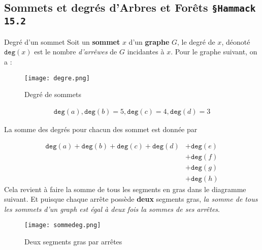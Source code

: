 \documentclass[16pt]{report}
\begin{document}
\begin{multicols*}{2}
             \section{Sommets et degrés d'Arbres et Forêts \texttt{\small{\S Hammack 15.2}}}
            \begin{Definitionx}{Degré d'un sommet}{}
                Soit un \textbf{sommet} $x$ d'un \textbf{graphe} $G$, le degré de $x$, déonoté 
                $\texttt{deg}(x)$ est le nombre \textit{d'arrêwes} de $G$ incidantes à $x$. 
                Pour le graphe suivant, on a : 
            \end{Definitionx}
           

            \begin{figure}[H]
                \begin{center}
                    \texttt{[image: degre.png]}
                \end{center}
                \caption{Degré de sommets}            
            \end{figure}
            
            
            \begin{align*}
                \texttt{deg}(a), \texttt{deg}(b) = 5,  \texttt{deg}(c) = 4, \texttt{deg}(d) = 3
            \end{align*}

            La somme des degrés pour chacun des sommet est donnée par 

             \begin{align*}
                 \texttt{deg}(a) + \texttt{deg}(b) + \texttt{deg}(c) + \texttt{deg}(d) &+ \texttt{deg}(e) \\
                                                           &+ \texttt{deg}(f) \\
                                                           &+ \texttt{deg}(g) \\
                                                           &+ \texttt{deg}(h)
            \end{align*}
            Cela revient à faire la somme de tous les segments en gras dans le diagramme suivant. Et puisque 
            chaque arrête possède \textbf{deux} segments gras, \textit{la somme de tous les sommets d'un graph est 
            égal à deux fois la sommes de ses arrêtes}.

            \begin{figure}[H]
                \begin{center}
                    \texttt{[image: sommedeg.png]}
                \end{center}
                \caption{Deux segments gras par arrêtes}
            \end{figure}
            


\end{multicols*}
\end{document}
